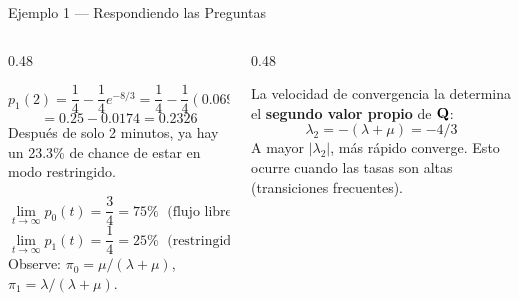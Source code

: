 \documentclass[aspectratio=1610, 9pt]{beamer}
\begin{document}
\begin{frame}{Ejemplo 1 --- Respondiendo las Preguntas}

\begin{columns}[T]
\begin{column}{0.48\textwidth}

\begin{preguntabox}[\textbf{(a)} Prob.\ restringido a $t = 2$ min]
\[
p_1(2) = \frac{1}{4} - \frac{1}{4}e^{-8/3} = \frac{1}{4} - \frac{1}{4}(0.0695)
\]
\[
= 0.25 - 0.0174 = \mathbf{0.2326}
\]
Despu\'es de solo 2 minutos, ya hay un 23.3\% de chance de estar en modo restringido.
\end{preguntabox}

\vspace{4pt}
\begin{preguntabox}
\[
\lim_{t \to \infty} p_0(t) = \frac{3}{4} = 75\% \;\text{ (flujo libre)}
\]
\[
\lim_{t \to \infty} p_1(t) = \frac{1}{4} = 25\% \;\text{ (restringido)}
\]
Observe: $\pi_0 = \mu/(\lambda+\mu)$, $\pi_1 = \lambda/(\lambda+\mu)$.
\end{preguntabox}

\end{column}
\begin{column}{0.48\textwidth}

\begin{alertabox}
La velocidad de convergencia la determina el \textbf{segundo valor propio} de $\mathbf{Q}$:
\[
\lambda_2 = -(\lambda + \mu) = -4/3
\]
A mayor $|\lambda_2|$, m\'as r\'apido converge. Esto ocurre cuando las tasas son altas (transiciones frecuentes).
\end{alertabox}
\end{column}
\end{columns}
\end{frame}
\end{document}
